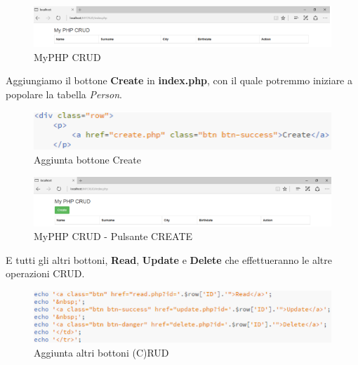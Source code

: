 \begin{center}
\begin{figure}[H]
\centering
\includegraphics[scale=1]{figures/MyPHP_CRUD.png}
\caption{MyPHP CRUD} 
\end{figure}
\end{center}

Aggiungiamo il bottone \textbf{Create} in \textbf{index.php}, con il quale potremmo iniziare a popolare la tabella \textit{Person}.

\begin{center}
\begin{figure}[H]
\centering
\includegraphics[scale=1]{figures/divcreate.png}
\caption{Aggiunta bottone Create} 
\end{figure}
\end{center}

\begin{center}
\begin{figure}[H]
\centering
\includegraphics[scale=1]{figures/MyPHP_CRUD_CREATE.png}
\caption{MyPHP CRUD - Pulsante CREATE} 
\end{figure}
\end{center}

E tutti gli altri bottoni, \textbf{Read}, \textbf{Update} e \textbf{Delete} che effettueranno le altre operazioni CRUD. 

\begin{center}
\begin{figure}[H]
\centering
\includegraphics[scale=1]{figures/other_buttons.png}
\caption{Aggiunta altri bottoni (C)RUD} 
\end{figure}
\end{center}

